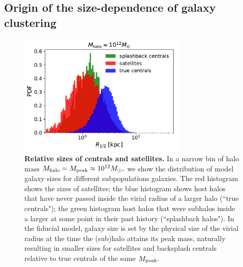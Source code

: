 \documentclass[usenatbib,usegraphicx,letterpaper]{mn2e}
\newcommand{\rhalf}{R_{1/2}}
\newcommand{\mpeak}{M_{\rm peak}}
\newcommand{\mhalo}{M_{\rm halo}}
\newcommand{\msun}{M_\odot}
\begin{document}
\subsection{Origin of the size-dependence of galaxy clustering}
\label{subsec:shuffle_tests}

\begin{figure}
\centering
\includegraphics[width=8cm]{FIGS/cen_sat_sizes.pdf}
\caption{
{\bf Relative sizes of centrals and satellites.} In a narrow bin of halo mass $\mhalo=\mpeak\approx10^{12}\msun,$ we show the distribution of model galaxy sizes for different subpopulations galaxies. The red histogram shows the sizes of satellites; the blue histogram shows host halos that have never passed inside the virial radius of a larger halo (``true centrals"); the green histogram host halos that were subhalos inside a larger at some point in their past history (``splashback halos"). In the fiducial model, galaxy size is set by the physical size of the virial radius at the time the (sub)halo attains its peak mass, naturally resulting in smaller sizes for satellites and backsplash centrals relative to true centrals of the same $\mpeak.$
}
\label{fig:shuffle}
\end{figure}


\end{document}
